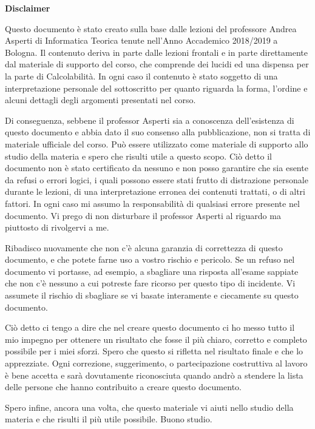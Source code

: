 %
%
%
%
\thispagestyle{plain}
\begin{center}
    \Large
    \textbf{Disclaimer}
\end{center}

Questo documento è stato creato sulla base dalle lezioni del professore Andrea Asperti di
Informatica Teorica tenute nell'Anno Accademico 2018/2019 a Bologna. Il contenuto deriva in parte
dalle lezioni frontali e in parte direttamente dal materiale di supporto del corso, che comprende
dei lucidi ed una dispensa per la parte di Calcolabilità. In ogni caso il contenuto è stato
soggetto di una interpretazione personale del sottoscritto per quanto riguarda la forma, l'ordine e
alcuni dettagli degli argomenti presentati nel corso.

Di conseguenza, sebbene il professor Asperti sia a conoscenza dell'esistenza di questo documento e
abbia dato il suo consenso alla pubblicazione, non si tratta di materiale ufficiale del corso. Può
essere utilizzato come materiale di supporto allo studio della materia e spero che risulti utile a
questo scopo. Ciò detto il documento non è stato certificato da nessuno e non posso garantire che
sia esente da refusi o errori logici, i quali possono essere stati frutto di distrazione personale
durante le lezioni, di una interpretazione erronea dei contenuti trattati, o di altri fattori. In
ogni caso mi assumo la responsabilità di qualsiasi errore presente nel documento. Vi prego di non
disturbare il professor Asperti al riguardo ma piuttosto di rivolgervi a me.

Ribadisco nuovamente che non c'è alcuna garanzia di correttezza di questo documento, e che potete
farne uso a vostro rischio e pericolo. Se un refuso nel documento vi portasse, ad esempio, a
sbagliare una risposta all'esame sappiate che non c'è nessuno a cui potreste fare ricorso per
questo tipo di incidente. Vi assumete il rischio di sbagliare se vi basate interamente e ciecamente
su questo documento.

Ciò detto ci tengo a dire che nel creare questo documento ci ho messo tutto il mio impegno per
ottenere un risultato che fosse il più chiaro, corretto e completo possibile per i miei sforzi.
Spero che questo si rifletta nel risultato finale e che lo apprezziate. Ogni correzione,
suggerimento, o partecipazione costruttiva al lavoro è bene accetta e sarà dovutamente
riconosciuta quando andrò a stendere la lista delle persone che hanno contribuito a creare questo
documento.

Spero infine, ancora una volta, che questo materiale vi aiuti nello studio della materia e che
risulti il più utile possibile. Buono studio.
